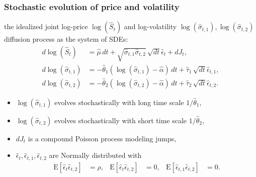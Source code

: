 \documentclass{beamer}
\newcommand{\E}[1]{\mbox{E}\left[#1\right]}
\begin{document}
\begin{frame}
  \frametitle{Stochastic evolution of price and volatility}
  the idealized joint log-price $\log(\hat{S}_t)$ and log-volatility
  $\log(\hat{\sigma}_{t,1}), \log(\hat{\sigma}_{t,2})$ diffusion
  process as the system of SDEs:
  \begin{align*}
  d\log(\hat{S}_t) &= \hat{\mu}\, dt + \sqrt{\hat{\sigma}_{t,1} \hat{\sigma}_{t,2}}\, \sqrt{dt} \hat{\epsilon}_{t} + dJ_t  ,   \\
  d\log( \hat{ \sigma }_{t,1}) &= -\hat{\theta}_1 ( \log(\hat{\sigma}_{t,1} ) - \hat{\alpha} )\, dt + \hat{\tau}_1\, \sqrt{dt} \hat{\epsilon}_{t,1}  , \\
  d\log( \hat{ \sigma }_{t,2}) &= -\hat{\theta}_2 ( \log(\hat{\sigma}_{t,2} ) - \hat{\alpha} )\, dt + \hat{\tau}_2\, \sqrt{dt} \hat{\epsilon}_{t,2}  . 
  \end{align*}

  \begin{itemize}
  \item $\log(\hat{\sigma}_{t,1})$ evolves stochastically with long time scale $1/\hat{\theta}_1,$
  \item $\log(\hat{\sigma}_{t,2})$ evolves stochastically with short time scale $1/\hat{\theta}_2,$
  \item $dJ_t$ is a compound Poisson process modeling jumps,
  \item $\hat{\epsilon}_t, \hat{\epsilon}_{t,1}, \hat{\epsilon}_{t,2}$ are Normally distributed with 
    \begin{align*}
      \E{\hat{\epsilon}_t\hat{\epsilon}_{t,2}} &= \rho, & \E{\hat{\epsilon}_t\hat{\epsilon}_{t,2}} &= 0, & \E{\hat{\epsilon}_{t,1}\hat{\epsilon}_{t,2}} &= 0.
    \end{align*}
  \end{itemize}
    
\end{frame}
\end{document}

